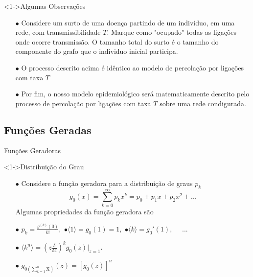 \documentclass{beamer}
\begin{document}
\begin{frame}

\begin{exampleblock}
    <1->{Algumas Observações}

    \begin{itemize}
   
        \item[$\bullet$] Considere um surto de uma doença partindo de um indivíduo, em uma rede, 
            com transmissibilidade $T$. Marque como "ocupado" todas as ligações onde ocorre 
            transmissão. O tamanho total do surto é o tamanho do componente do grafo que o 
            individuo inicial participa. 

        \item[$\bullet$] O processo descrito acima é idêntico ao modelo de percolação por 
            ligações com taxa $T$ 

        \item[$\bullet$] Por fim, o nosso modelo epidemiológico será matematicamente descrito 
            pelo processo de percolação por ligações com taxa $T$ sobre uma rede condigurada. 


    \end{itemize}


\end{exampleblock}

\end{frame}


\subsection{Funções Geradas}
\begin{frame}{Funções Geradoras}

\begin{exampleblock}
    <1->{Distribuição do Grau}

    \begin{itemize}
   

        \item[$\bullet$] Considere a função geradora para a distribuição de graus $p_k$
            \[
                g_0(x)= \sum_{k=0}^\infty p_k x^k = p_0 + p_1 x + p_2 x^2 + ...
            \]
            Algumas propriedades da função geradora são
        \item[$\bullet$] $p_k = \frac{g^{(k)}(0)}{k!},$ \quad 
            $\bullet \langle 1 \rangle = g_0 (1) = 1,$ \quad 
           $ \bullet \langle k \rangle = g_0 ' (1), \quad $ ... 
        \item[$\bullet$] 
$\langle k^n \rangle = \left( z \frac{\delta}{\delta z} \right)^k g_0(z) \bigg|_{z=1}.$
        \item[$\bullet$] $g_{0 \left(\sum_{k=1}^n \mathrm{X}\right)} (z) = [ g_0 (z)] ^n$
    \end{itemize}


\end{exampleblock}

\end{frame}
\end{document}
